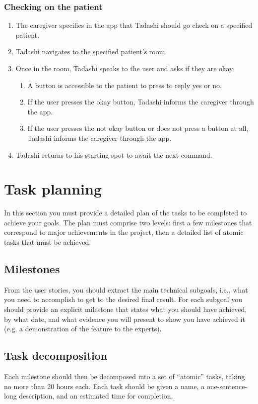 \documentclass{article}
\begin{document}
\subsubsection{Checking on the patient}
\begin{enumerate}
\item The caregiver specifies in the app that Tadashi should go check on a specified patient. 
\item Tadashi navigates to the specified patient's room.
\item Once in the room, Tadashi speaks to the user and asks if they are okay:
  \begin{enumerate}
  \item A button is accessible to the patient to press to reply yes or no.
  \item If the user presses the okay button, Tadashi informs the caregiver through the app. 
  \item If the user presses the not okay button or does not press a button at all, Tadashi informs the caregiver through the app.
  \end{enumerate}
\item Tadashi returns to his starting spot to await the next command. 
\end{enumerate}

\section{Task planning}
In this section you must provide a detailed plan of the tasks to be completed to achieve your goals. The plan must comprise two levels: first a few milestones that correspond to major achievements in the project, then a detailed list of atomic tasks that must be achieved.

\subsection{Milestones} 
From the user stories, you should extract the main technical subgoals, i.e., what you need to accomplish to get to the desired final result. For each subgoal you should provide an explicit milestone that states what you should have achieved, by what date, and what evidence you will present to show you have achieved it (e.g. a demonstration of the feature to the experts).


\subsection{Task decomposition} 
Each milestone should then be decomposed into a set of ``atomic'' tasks, taking no more than 20 hours each. Each task should be given a name, a one-sentence-long description, and an estimated time for completion.
\end{document}
